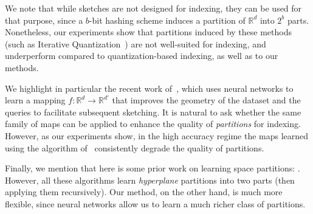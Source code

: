 \documentclass[11pt]{article}
\newcommand{\R}{\mathbb R}
\begin{document}
We note that while sketches are not designed for indexing, they can be used for that purpose, since a $b$-bit hashing scheme induces a partition of $\R^d$ into $2^b$ parts.
%
Nonetheless, our experiments show that partitions induced by these methods (such as Iterative Quantization~\cite{gong2013iterative}) are not well-suited for indexing, and underperform compared to quantization-based indexing, as well as to our methods.

We highlight in particular the recent work of~\cite{sablayrolles2018spreading}, which uses neural networks to learn a mapping $f \colon \mathbb{R}^d \to \mathbb{R}^{d'}$
that improves the geometry of the dataset and the queries to facilitate subsequent sketching.
It is natural to ask whether the same family of maps can be applied to enhance the quality of \emph{partitions} for indexing. However,
as our experiments show, in the high accuracy regime the maps learned using the algorithm of~\cite{sablayrolles2018spreading}
consistently degrade the quality of partitions.



Finally, we mention that here is some prior work on learning space partitions: \cite{cayton2008learning,ram2013space,li2011learning}.
However, all these algorithms learn \emph{hyperplane} partitions into two parts (then applying them recursively).
Our method, on the other hand, is much more flexible, since neural networks allow us to learn a much richer class of partitions.
\end{document}
